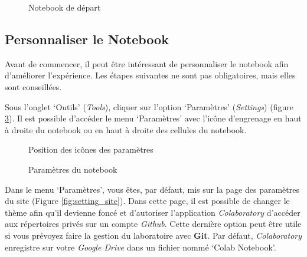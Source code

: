 \documentclass{article}
\begin{document}
\begin{figure}[H]
  \centering
  \caption{Notebook de départ}
  \label{fig:open}
\end{figure}

\subsection{Personnaliser le Notebook}
Avant de commencer, il peut être intéressant de personnaliser le notebook afin d'améliorer l'expérience. Les étapes suivantes ne sont pas obligatoires, mais elles sont conseillées.
\medbreak

Sous l'onglet `Outils' (\textit{Tools}), cliquer sur l'option `Paramètres' (\textit{Settings}) (figure \ref{fig:setting}). Il est possible d'accéder le menu `Paramètres' avec l'icône d'engrenage en haut à droite du notebook ou en haut à droite des cellules du notebook.

\begin{figure}[H]
  \centering
  \caption{Position des icônes des paramètres}
  \label{fig:setting_position}
\end{figure}

\begin{figure}[H]
  \centering
  \caption{Paramètres du notebook}
  \label{fig:setting}
\end{figure}

Dans le menu `Paramètres', vous êtes, par défaut, mis sur la page des paramètres du site (Figure \ref{fig:setting_site}). Dans cette page, il est possible de changer le thème afin qu'il devienne foncé et d'autoriser l'application \textit{Colaboratory} d'accéder aux répertoires privés sur un compte \textit{Github}. Cette dernière option peut être utile si vous prévoyez faire la gestion du laboratoire avec \textbf{Git}. Par défaut, \textit{Colaboratory} enregistre sur votre \textit{Google Drive} dans un fichier nommé `Colab Notebook'.
\end{document}
